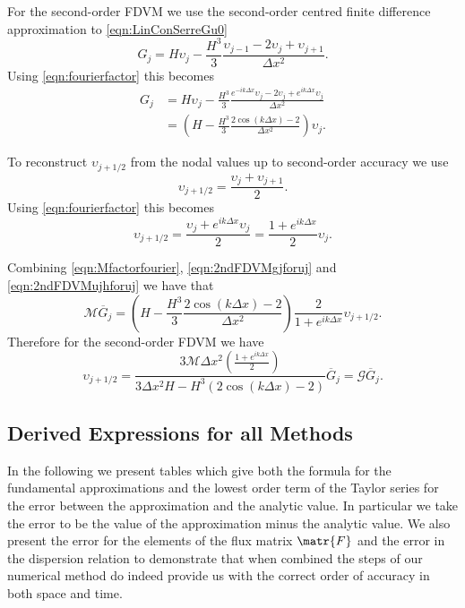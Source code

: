 For the second-order FDVM we use the second-order centred finite difference approximation to \eqref{eqn:LinConSerreGu0}
\begin{equation*}
G_j = H\upsilon_j - \frac{H^3}{3}\frac{\upsilon_{j-1} - 2\upsilon_{j} + \upsilon_{j+1}}{\Delta x^2}.
\end{equation*} 
Using \eqref{eqn:fourierfactor} this becomes
\begin{align}
\label{eqn:2ndFDVMgjforuj}
G_j &= H\upsilon_j - \frac{H^3}{3}\frac{e^{-ik\Delta x}\upsilon_{j} - 2\upsilon_{j} + e^{ik\Delta x}\upsilon_{j}}{\Delta x^2}  \nonumber \\&= \left(H - \frac{H^3}{3}\frac{2\cos\left(k\Delta x\right) - 2}{\Delta x^2}\right)\upsilon_j.
\end{align} 

To reconstruct $\upsilon_{j+1/2}$ from the nodal values up to second-order accuracy we use
\begin{equation*}
\upsilon_{j+1/2} = \frac{\upsilon_j + \upsilon_{j+1}}{2}.
\end{equation*}
Using \eqref{eqn:fourierfactor} this becomes
\begin{equation}
\label{eqn:2ndFDVMujhforuj}
\upsilon_{j+1/2} = \frac{\upsilon_j + e^{ik\Delta x}\upsilon_{j}}{2} = \frac{1 + e^{ik\Delta x}}{2}\upsilon_j.
\end{equation}

Combining \eqref{eqn:Mfactorfourier}, \eqref{eqn:2ndFDVMgjforuj} and \eqref{eqn:2ndFDVMujhforuj} we have that
\begin{equation*}
 \mathcal{M} \overline{G}_j = \left(H - \frac{H^3}{3}\frac{2\cos\left(k\Delta x\right) - 2}{\Delta x^2}\right)\frac{2}{1 + e^{ik\Delta x}}\upsilon_{j+1/2}.
\end{equation*} 
Therefore for the second-order FDVM we have
\begin{equation*}
\upsilon_{j+1/2} = \dfrac{3 \mathcal{M}\Delta x^2 \left(\frac{1 + e^{ik\Delta x}}{2}\right)}{3 \Delta x^2 H - H^3 \left(2\cos\left(k\Delta x\right) - 2\right)} \overline{G}_j  = \mathcal{G}\overline{G}_j . 
\end{equation*} 


\subsection{Derived Expressions for all Methods}
\label{subsec:TabFacdisp}
In the following we present tables which give both the formula for the fundamental approximations and the lowest order term of the Taylor series for the error between the approximation and the analytic value. In particular we take the error to be the value of the approximation minus the analytic value. We also present the error for the elements of the flux matrix $\matr{F}$ and the error in the dispersion relation to demonstrate that when combined the steps of our numerical method do indeed provide us with the correct order of accuracy in both space and time. 

